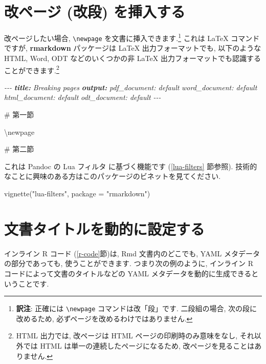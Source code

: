 \documentclass[
  11pt,
  lualatex,
  ja=standard]{bxjsreport}
\newenvironment{Shaded}{\begin{snugshade}}{\end{snugshade}}
\newcommand{\AnnotationTok}[1]{\textcolor[rgb]{0.56,0.35,0.01}{\textbf{\textit{#1}}}}
\newcommand{\AttributeTok}[1]{\textcolor[rgb]{0.77,0.63,0.00}{#1}}
\newcommand{\CommentTok}[1]{\textcolor[rgb]{0.56,0.35,0.01}{\textit{#1}}}
\newcommand{\FunctionTok}[1]{\textcolor[rgb]{0.00,0.00,0.00}{#1}}
\newcommand{\NormalTok}[1]{#1}
\newcommand{\StringTok}[1]{\textcolor[rgb]{0.31,0.60,0.02}{#1}}
\begin{document}
\hypertarget{pagebreaks}{%
\section{改ページ (改段) を挿入する}\label{pagebreaks}}

改ページしたい場合, \texttt{\textbackslash{}newpage} を文書に挿入できます.\footnote{\textbf{訳注}: 正確には \texttt{\textbackslash{}newpage} コマンドは改「段」です. 二段組の場合, 次の段に改めるため, 必ずページを改めるわけではありません.} これは LaTeX コマンドですが, \textbf{rmarkdown} パッケージは LaTeX 出力フォーマットでも, 以下のような HTML, Word, ODT などのいくつかの非 LaTeX 出力フォーマットでも認識することができます.\footnote{HTML 出力では, 改ページは HTML ページの印刷時のみ意味をなし, それ以外では HTML は単一の連続したページになるため, 改ページを見ることはありません.}

\begin{Shaded}
\begin{Highlighting}[]
\CommentTok{{-}{-}{-}}
\AnnotationTok{title:}\CommentTok{ Breaking pages}
\AnnotationTok{output:}
\CommentTok{  pdf\_document: default}
\CommentTok{  word\_document: default}
\CommentTok{  html\_document: default}
\CommentTok{  odt\_document: default}
\CommentTok{{-}{-}{-}}

\FunctionTok{\# 第一節}

\NormalTok{\textbackslash{}newpage}

\FunctionTok{\# 第二節}
\end{Highlighting}
\end{Shaded}

これは Pandoc の Lua フィルタ に基づく機能です (\ref{lua-filters} 節参照). 技術的なことに興味のある方はこのパッケージのビネットを見てください.

\begin{Shaded}
\begin{Highlighting}[]
\FunctionTok{vignette}\NormalTok{(}\StringTok{"lua{-}filters"}\NormalTok{, }\AttributeTok{package =} \StringTok{"rmarkdown"}\NormalTok{)}
\end{Highlighting}
\end{Shaded}

\hypertarget{dynamic-yaml}{%
\section{文書タイトルを動的に設定する}\label{dynamic-yaml}}

インライン R コード (\ref{r-code}節)は, Rmd 文書内のどこでも, YAML メタデータの部分であっても, 使うことができます. つまり次の例のように, インライン R コードによって文書のタイトルなどの YAML メタデータを動的に生成できるということです.
\end{document}
